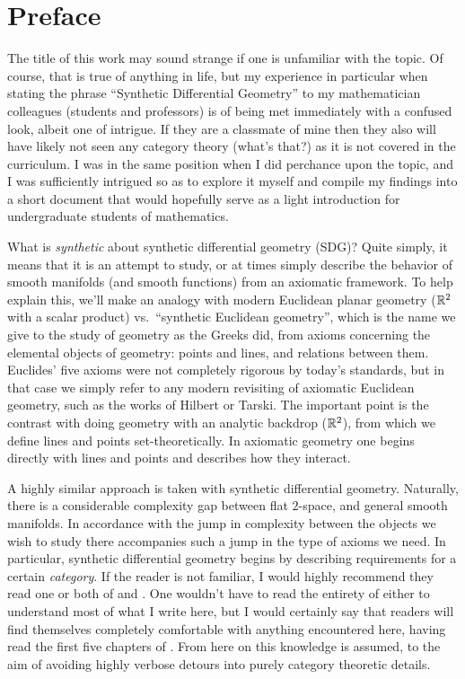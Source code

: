 \chapter*{Preface}

The title of this work may sound strange if one is unfamiliar with the topic. Of course, that is true of anything in life, but my experience in particular when stating the phrase ``Synthetic Differential Geometry'' to my mathematician colleagues (students and professors) is of being met immediately with a confused look, albeit one of intrigue. If they are a classmate of mine then they also will have likely not seen any category theory (what's that?) as it is not covered in the curriculum. I was in the same position when I did perchance upon the topic, and I was sufficiently intrigued so as to explore it myself and compile my findings into a short document that would hopefully serve as a light introduction for undergraduate students of mathematics.

What is \emph{synthetic} about synthetic differential geometry (SDG)? Quite simply, it means that it is an attempt to study, or at times simply describe the behavior of smooth manifolds (and smooth functions) from an axiomatic framework. To help explain this, we'll make an analogy with modern Euclidean planar geometry (\( \mathbb{R}^2 \) with a scalar product) vs.\ ``synthetic Euclidean geometry'', which is the name we give to the study of geometry as the Greeks did, from axioms concerning the elemental objects of geometry: points and lines, and relations between them. Euclides' five axioms were not completely rigorous by today's standards, but in that case we simply refer to any modern revisiting of axiomatic Euclidean geometry, such as the works of Hilbert or Tarski. The important point is the contrast with doing geometry with an analytic backdrop (\( \mathbb{R}^2 \)), from which we define lines and points set-theoretically. In axiomatic geometry one begins directly with lines and points and describes how they interact.

A highly similar approach is taken with synthetic differential geometry. Naturally, there is a considerable complexity gap between flat \( 2 \)-space, and general smooth manifolds. In accordance with the jump in complexity between the objects we wish to study there accompanies such a jump in the type of axioms we need. In particular, synthetic differential geometry begins by describing requirements for a certain \emph{category}. If the reader is not familiar, I would highly recommend they read one or both of \cite{sml71} and \cite{lei16}. One wouldn't have to read the entirety of either to understand most of what I write here, but I would certainly say that readers will find themselves completely comfortable with anything encountered here, having read the first five chapters of \cite{lei16}. From here on this knowledge is assumed, to the aim of avoiding highly verbose detours into purely category theoretic details.

